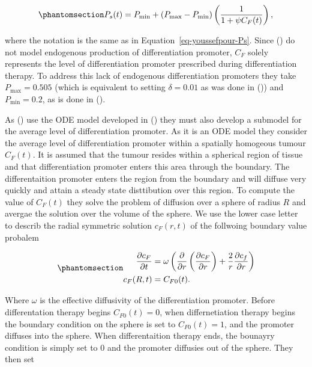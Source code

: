 \documentclass[
  letterpaper,
]{scrreprt}
\theoremstyle{definition}
\theoremstyle{remark}
\begin{document}
\begin{equation}\phantomsection\label{eq-bachman-Ps}{
P_s(t) = P_\text{min} + (P_\text{max} - P_\text{min}) \left( \frac{1}{1 + \psi C_F(t)} \right),
}\end{equation}

where the notation is the same as in Equation~\ref{eq-youssefpour-Ps}.
Since () do not model
endogenous production of differentiation promoter, \(C_F\) solely
represents the level of differentiation promoter prescribed during
differentiation therapy. To address this lack of endogenous
differentiation promoters they take \(P_\text{max} = 0.505\) (which is
equivalent to setting \(\delta = 0.01\) as was done in
()) and
\(P_\text{min} = 0.2\), as is done in
().

As () use the ODE
model developed in () they must also develop a submodel for the average level
of differentiation promoter. As it is an ODE model they consider the
average level of differentiation promoter within a spatially homogeous
tumour \(C_F(t)\). It is assumed that the tumour resides within a
spherical region of tissue and that differentiation promoter enters this
area through the boundary. The differentaition promoter enters the
region from the boundary and will diffuse very quickly and attain a
steady state disttibution over this region. To compute the value of
\(C_F(t)\) they solve the problem of diffusion over a sphere of radius
\(R\) and avergae the solution over the volume of the sphere. We use the
lower case letter to describ the radial symmetric solution \(c_F(r,t)\)
of the follwoing boundary value probalem

\begin{equation}\phantomsection\label{eq-bachman-CF}{
\begin{aligned}
\frac{\partial c_F}{\partial t} &= \omega \left( \frac{\partial}{\partial r} \left(\frac{\partial c_F}{\partial r} \right) + \frac{2}{r} \frac{\partial c_f}{\partial r}   \right) \\
c_F(R,t) &= C_{F0}(t).
\end{aligned}
}\end{equation}

Where \(\omega\) is the effective diffusivity of the differentiation
promoter. Before differentation therapy begins \(C_{F0}(t) = 0\), when
differnetiation therapy begins the boundary condition on the sphere is
set to \(C_{F0}(t) = 1\), and the promoter diffuses into the sphere.
When differentaition therapy ends, the bounayry condition is simply set
to 0 and the promoter diffusies out of the sphere. They then set
\end{document}
